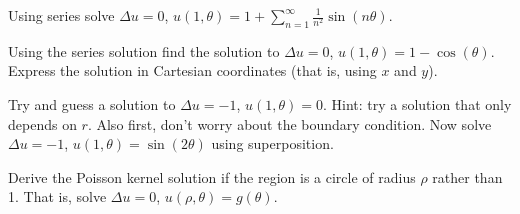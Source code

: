 \setcounter{exercise}{100}

\begin{exercise}
Using series solve
$\Delta u = 0$, $u(1,\theta) = 1+ \sum\limits_{n=1}^\infty \frac{1}{n^2}\sin(n\theta)$.
\end{exercise}

\begin{exercise}
Using the series solution find the solution to
$\Delta u = 0$, $u(1,\theta) = 1- \cos(\theta)$.  Express the solution
in Cartesian coordinates (that is, using $x$ and $y$).
\end{exercise}

\begin{exercise}
\leavevmode
\begin{tasks}
\task
Try and guess a solution to $\Delta u = -1$, $u(1,\theta) = 0$.
Hint: try a solution that only depends on $r$.  Also first, don't worry
about the boundary condition.
\task
Now solve $\Delta u = -1$, $u(1,\theta) = \sin(2\theta)$ using
superposition.
\end{tasks}
\end{exercise}

\begin{exercise}[challenging]
Derive the Poisson kernel solution
if the region is a circle of radius $\rho$ rather
than 1.  That is, solve $\Delta u = 0$, $u(\rho,\theta) = g(\theta)$.
\end{exercise}
